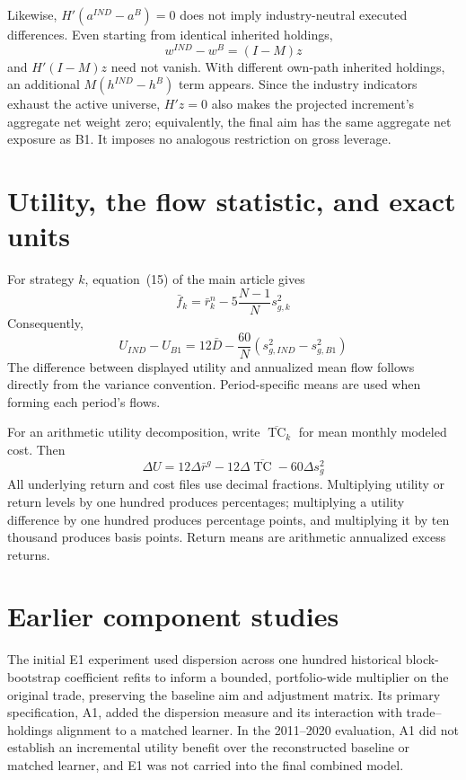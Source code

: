 \documentclass[12pt,letterpaper,fleqn]{article}
\begin{document}
Likewise, $H'(a^{IND}-a^B)=0$ does not imply industry-neutral executed differences. Even starting from identical inherited holdings,
\begin{equation}
 w^{IND}-w^B=(I-M)z
\end{equation}
and $H'(I-M)z$ need not vanish. With different own-path inherited holdings, an additional $M(h^{IND}-h^B)$ term appears. Since the industry indicators exhaust the active universe, $H'z=0$ also makes the projected increment's aggregate net weight zero; equivalently, the final aim has the same aggregate net exposure as B1. It imposes no analogous restriction on gross leverage.

\section{Utility, the flow statistic, and exact units}\label{app:metrics}
For strategy $k$, equation~(15) of the main article gives
\begin{equation}
 \bar f_k=\bar r^n_k-5\frac{N-1}{N}s_{g,k}^2
\end{equation}
Consequently,
\begin{equation}
 U_{IND}-U_{B1}
 =12\bar D-\frac{60}{N}(s_{g,IND}^2-s_{g,B1}^2)
\end{equation}
The difference between displayed utility and annualized mean flow follows directly from the variance convention. Period-specific means are used when forming each period's flows.

For an arithmetic utility decomposition, write $\overline{\operatorname{TC}}_k$ for mean monthly modeled cost. Then
\begin{equation}
 \Delta U=12\Delta\bar r^g-12\Delta\overline{\operatorname{TC}}
                         -60\Delta s_g^2
\end{equation}
All underlying return and cost files use decimal fractions. Multiplying utility or return levels by one hundred produces percentages; multiplying a utility difference by one hundred produces percentage points, and multiplying it by ten thousand produces basis points. Return means are arithmetic annualized excess returns.

\section{Earlier component studies}\label{app:development}
The initial E1 experiment used dispersion across one hundred historical block-bootstrap coefficient refits to inform a bounded, portfolio-wide multiplier on the original trade, preserving the baseline aim and adjustment matrix. Its primary specification, A1, added the dispersion measure and its interaction with trade--holdings alignment to a matched learner. In the 2011--2020 evaluation, A1 did not establish an incremental utility benefit over the reconstructed baseline or matched learner, and E1 was not carried into the final combined model.
\end{document}
